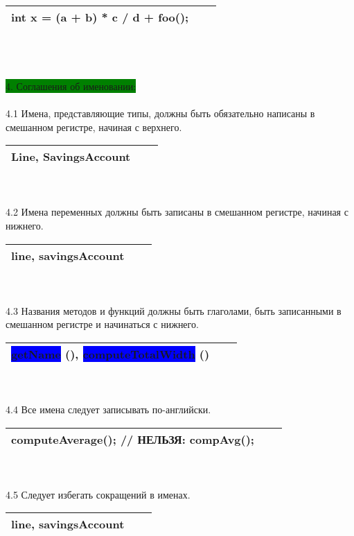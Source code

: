 \documentclass{article}
\begin{document}
\begin{tabular}{ | l | l | l | }
\hline
int x = (a + b) * c / d + foo(); \\
\hline
\end{tabular}\\
\\\\
\colorbox{green}{4. Соглашения об именовании:}
\\\\
4.1 Имена, представляющие типы, должны быть обязательно написаны в смешанном регистре, начиная с верхнего.
\\
\begin{tabular}{ | l | l | l | }
\hline
\colorbox{BurntOrange}{Line}, SavingsAccount \\
\hline
\end{tabular}
\\\\
4.2 Имена переменных должны быть записаны в смешанном регистре, начиная с нижнего.
\\
\begin{tabular}{ | l | l | l | }
\hline
\colorbox{BurntOrange}{line}, savingsAccount \\
\hline
\end{tabular}
\\\\
4.3 Названия методов и функций должны быть глаголами, быть записанными в смешанном регистре и начинаться с нижнего.
\\
\begin{tabular}{ | l | l | l | }
\hline
\colorbox{Blue}{getName}  \colorbox{BurntOrange}{()}, \colorbox{Blue}{computeTotalWidth}  \colorbox{BurntOrange}{()}\\
\hline
\end{tabular}
\\\\
4.4 Все имена следует записывать по-английски.
\\
\begin{tabular}{ | l | l | l | }
\hline
computeAverage();   // НЕЛЬЗЯ: compAvg(); \\
\hline
\end{tabular}
\\\\
4.5 Следует избегать сокращений в именах.
\\
\begin{tabular}{ | l | l | l | }
\hline
\colorbox{BurntOrange}{line}, savingsAccount \\
\hline
\end{tabular}\\\\
\end{document}

